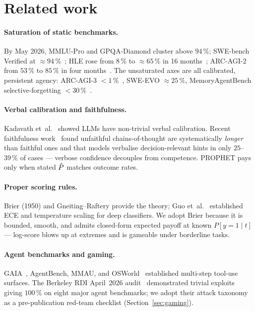 \section{Related work}\label{sec:related}

\paragraph{Saturation of static benchmarks.}
By May 2026, MMLU-Pro and GPQA-Diamond cluster above $94\,\%$;
SWE-bench Verified at $\approx 94\,\%$~\cite{swebench};
HLE rose from $8\,\%$ to $\approx 65\,\%$ in 16 months~\cite{hle};
ARC-AGI-2 from $53\,\%$ to $85\,\%$ in four months~\cite{arcagi2}.
The unsaturated axes are all calibrated, persistent agency:
ARC-AGI-3 $<1\,\%$~\cite{arcagi3}, SWE-EVO $\approx 25\,\%$,
MemoryAgentBench selective-forgetting $<30\,\%$~\cite{memoryagentbench}.

\paragraph{Verbal calibration and faithfulness.}
Kadavath et~al.~\cite{kadavath2022} showed LLMs have non-trivial verbal
calibration. Recent faithfulness work~\cite{anthropic_faithfulness}
found unfaithful chains-of-thought are systematically \emph{longer}
than faithful ones and that models verbalise decision-relevant hints
in only $25$--$39\,\%$ of cases --- verbose confidence decouples from
competence. PROPHET pays only when stated $\hat{P}$ matches outcome rates.

\paragraph{Proper scoring rules.} Brier (1950) and Gneiting--Raftery
\cite{gneiting2007} provide the theory; Guo et~al.~\cite{guo2017}
established ECE and temperature scaling for deep classifiers. We adopt
Brier because it is bounded, smooth, and admits closed-form expected
payoff at known $P[y=1\!\mid\!t]$ --- log-score blows up at extremes
and is gameable under borderline tasks.

\paragraph{Agent benchmarks and gaming.}
GAIA~\cite{gaia}, AgentBench, MMAU, and OSWorld~\cite{osworld}
established multi-step tool-use surfaces. The Berkeley RDI April~2026
audit~\cite{berkeley_rdi_audit} demonstrated trivial exploits giving
$100\,\%$ on eight major agent benchmarks; we adopt their attack
taxonomy as a pre-publication red-team checklist
(Section~\ref{sec:gaming}).

